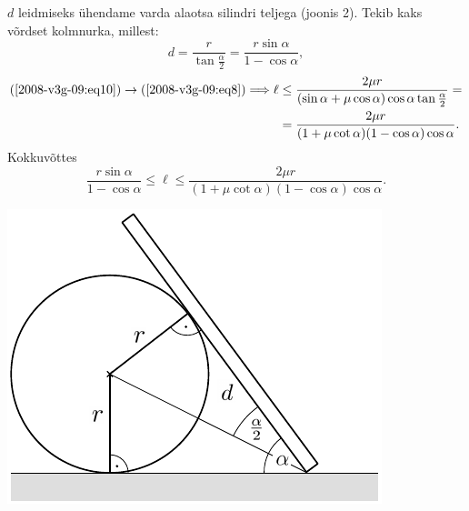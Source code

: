 \documentclass[10pt, twoside]{article}
\begin{document}
{$d$ leidmiseks ühendame varda alaotsa silindri teljega (joonis 2). Tekib kaks võrdset kolmnurka, millest:
\begin{equation}\label{2008-v3g-09:eq10}
d=\frac{r}{\tan \frac{\alpha}{2}}=\frac{r \sin \alpha}{1-\cos \alpha},
\end{equation}
\[
\begin{aligned}
(\ref{2008-v3g-09:eq10}) \rightarrow(\ref{2008-v3g-09:eq8}) \Longrightarrow \ell & \leq \frac{2 \mu r}{(\sin \alpha+\mu \cos \alpha) \cos \alpha \tan \frac{\alpha}{2}}=\\
&=\frac{2 \mu r}{(1+\mu \cot \alpha)(1-\cos \alpha) \cos \alpha} .
\end{aligned}
\]
Kokkuvõttes
\[
\frac{r \sin \alpha}{1-\cos \alpha} \leq \ell \leq \frac{2 \mu r}{(1+\mu \cot \alpha)(1-\cos \alpha) \cos \alpha}.
\]

\begin{center}
	\includegraphics[width=0.7\linewidth]{2008-v3g-09-lah2}
\end{center}
\probend
\bigskip


}
\end{document}

